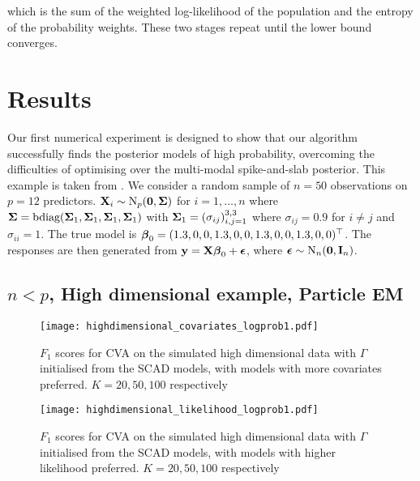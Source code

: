 \documentclass{amsart}[12pt]
\begin{document}
which is the sum of the weighted log-likelihood of the population and the entropy of the probability weights.
These two stages repeat until the lower bound converges.

\section{Results}


Our first numerical experiment is designed to show that our algorithm successfully finds the posterior models
of high probability, overcoming the difficulties of optimising over the multi-modal spike-and-slab posterior.
This example is taken from \citep{Rockova2016}. 
We consider a random sample of $n = 50$ observations on $p = 12$ predictors. ${\bf X}_i \sim \text{N}_p({\bf 0}, {\boldsymbol \Sigma})$
for $i = 1, \ldots, n$ where
${\boldsymbol \Sigma} = \text{bdiag}({\boldsymbol \Sigma}_1, {\boldsymbol \Sigma}_1, {\boldsymbol \Sigma}_1, {\boldsymbol \Sigma}_1)$ with
${\boldsymbol \Sigma}_1 = (\sigma_{ij})_{i, j = 1}^{3, 3}$ where $\sigma_{ij} = 0.9$ for $i \ne j$ and $\sigma_{ii} = 1$.
The true model is ${\boldsymbol \beta}_0 = (1.3, 0, 0, 1.3, 0, 0, 1.3, 0, 0, 1.3, 0, 0)^\top$.
The responses are then generated from ${\bf y} = {\bf X} {\boldsymbol \beta}_0 + {\boldsymbol \epsilon}$, where
${\boldsymbol \epsilon} \sim \text{N}_n({\bf 0}, {\bf I}_n)$.

\subsection{$n < p$, High dimensional example, Particle EM}

\begin{figure}\label{fig:highdim_warm_start_covariates}
\caption{$F_1$ scores for CVA on the simulated high dimensional data with $\Gamma$ initialised from the SCAD models, with models with more covariates preferred. $K=20, 50, 100$ respectively}
\texttt{[image: highdimensional\_covariates\_logprob1.pdf]}
\end{figure}

\begin{figure}\label{fig:highdim_warm_start_likelihood}
\caption{$F_1$ scores for CVA on the simulated high dimensional data with $\Gamma$ initialised from the SCAD models, with models with higher likelihood preferred. $K=20, 50, 100$ respectively}
\texttt{[image: highdimensional\_likelihood\_logprob1.pdf]}
\end{figure}
\end{document}
